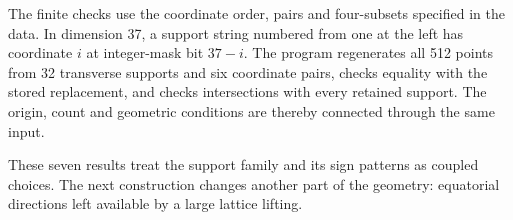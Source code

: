 The finite checks use the coordinate order, pairs and four-subsets
specified in the data. In dimension 37, a support string numbered from
one at the left has coordinate $i$ at integer-mask bit $37-i$.
The program regenerates all 512 points from 32 transverse supports and
six coordinate pairs, checks equality with the stored replacement, and
checks intersections with every retained support. The origin, count and
geometric conditions are thereby connected through the same input.

These seven results treat the support family and its sign patterns as
coupled choices. The next construction changes another part of the
geometry: equatorial directions left available by a large lattice lifting.
